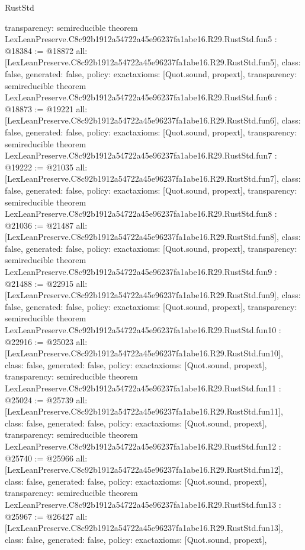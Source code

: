 \begin{lexlean}{RustStd}
\begin{coremodule}
{  transparency: semireducible
}
theorem LexLeanPreserve.C8c92b1912a54722a45e96237fa1abe16.R29.RustStd.fun5 : @18384 := @18872 {
  all: [LexLeanPreserve.C8c92b1912a54722a45e96237fa1abe16.R29.RustStd.fun5],
  class: false,
  generated: false,
  policy: exact{axioms: [Quot.sound, propext]},
  transparency: semireducible
}
theorem LexLeanPreserve.C8c92b1912a54722a45e96237fa1abe16.R29.RustStd.fun6 : @18873 := @19221 {
  all: [LexLeanPreserve.C8c92b1912a54722a45e96237fa1abe16.R29.RustStd.fun6],
  class: false,
  generated: false,
  policy: exact{axioms: [Quot.sound, propext]},
  transparency: semireducible
}
theorem LexLeanPreserve.C8c92b1912a54722a45e96237fa1abe16.R29.RustStd.fun7 : @19222 := @21035 {
  all: [LexLeanPreserve.C8c92b1912a54722a45e96237fa1abe16.R29.RustStd.fun7],
  class: false,
  generated: false,
  policy: exact{axioms: [Quot.sound, propext]},
  transparency: semireducible
}
theorem LexLeanPreserve.C8c92b1912a54722a45e96237fa1abe16.R29.RustStd.fun8 : @21036 := @21487 {
  all: [LexLeanPreserve.C8c92b1912a54722a45e96237fa1abe16.R29.RustStd.fun8],
  class: false,
  generated: false,
  policy: exact{axioms: [Quot.sound, propext]},
  transparency: semireducible
}
theorem LexLeanPreserve.C8c92b1912a54722a45e96237fa1abe16.R29.RustStd.fun9 : @21488 := @22915 {
  all: [LexLeanPreserve.C8c92b1912a54722a45e96237fa1abe16.R29.RustStd.fun9],
  class: false,
  generated: false,
  policy: exact{axioms: [Quot.sound, propext]},
  transparency: semireducible
}
theorem LexLeanPreserve.C8c92b1912a54722a45e96237fa1abe16.R29.RustStd.fun10 : @22916 := @25023 {
  all: [LexLeanPreserve.C8c92b1912a54722a45e96237fa1abe16.R29.RustStd.fun10],
  class: false,
  generated: false,
  policy: exact{axioms: [Quot.sound, propext]},
  transparency: semireducible
}
theorem LexLeanPreserve.C8c92b1912a54722a45e96237fa1abe16.R29.RustStd.fun11 : @25024 := @25739 {
  all: [LexLeanPreserve.C8c92b1912a54722a45e96237fa1abe16.R29.RustStd.fun11],
  class: false,
  generated: false,
  policy: exact{axioms: [Quot.sound, propext]},
  transparency: semireducible
}
theorem LexLeanPreserve.C8c92b1912a54722a45e96237fa1abe16.R29.RustStd.fun12 : @25740 := @25966 {
  all: [LexLeanPreserve.C8c92b1912a54722a45e96237fa1abe16.R29.RustStd.fun12],
  class: false,
  generated: false,
  policy: exact{axioms: [Quot.sound, propext]},
  transparency: semireducible
}
theorem LexLeanPreserve.C8c92b1912a54722a45e96237fa1abe16.R29.RustStd.fun13 : @25967 := @26427 {
  all: [LexLeanPreserve.C8c92b1912a54722a45e96237fa1abe16.R29.RustStd.fun13],
  class: false,
  generated: false,
  policy: exact{axioms: [Quot.sound, propext]},
}
\end{coremodule}
\end{lexlean}
